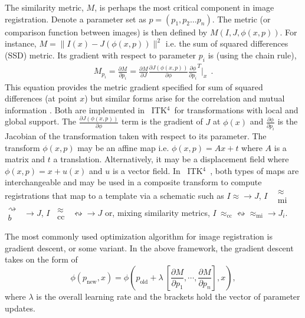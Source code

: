 \documentclass{frontiersSCNS}
\newcommand{\bsp}{$\substack{
   \rightsquigarrow \\
   b
  }$}
\newcommand{\mi}{$\substack{
   \approx \\
   \text{mi}
  }$}
\newcommand{\cc}{$\substack{
   \approx \\
   \text{cc}
  }$}
\newcommand{\tk}{~ITK$^{\text{4}}$~}
\begin{document}
The similarity metric, $M$, is perhaps the most critical component in image registration.  
Denote a parameter set as $p = (p_1, p_2 \ldots p_n)$.  
The metric (or comparison function between images) is then defined by $M(I,J,\phi(x,p))$.  For instance, $M=\|
I(x)-J(\phi(x,p)) \|^2$ i.e. the sum of squared differences (SSD) metric. Its gradient with respect to parameter $p_i$
is (using the chain rule), 
\begin{eqnarray}
 M_{p_i}=\frac{\partial M}{\partial
  p_i}=\frac{\partial M}{\partial J}\frac{\partial
  J(\phi(x,p))}{\partial \phi} \frac{\partial \phi}{\partial p_i}^T|_x
~~.
\label{eq:grad}
\end{eqnarray}
This equation provides the metric gradient specified for
sum of squared differences (at point $x$) but similar forms arise for the correlation
and mutual information \cite{hermosillo}.  Both are implemented in
\tk for transformations with local and global support.  The
$\frac{\partial J(\phi(x,p))}{\partial \phi}$ term is the gradient of $J$ at $\phi(x)$
and $\frac{\partial \phi}{\partial p_i}$ is the Jacobian of the transformation taken
with respect to its parameter.   The transform $\phi(x,p)$ may be
an affine map i.e. $\phi(x,p)=A x + t$ where $A$ is a matrix and
$t$ a translation.  Alternatively, it may be a displacement field
where $\phi(x,p)=x+u(x)$ and
$u$ is a vector field.  In \tk, both types of maps are interchangeable
and may be used in a composite transform to compute registrations that
map to a template via a schematic such as $ I \approx \rightarrow J $, $ I $ ~\mi~\bsp~$
\rightarrow  J $, $ I $~\cc~$ \leftrightsquigarrow \rightarrow J $
or, mixing similarity metrics, $I
~\approx_\text{cc}  \leftrightsquigarrow \approx_\text{mi}  \rightarrow
J_i $.  

The most commonly used optimization algorithm for image registration
is gradient descent, or some variant.   In the above framework, the
gradient descent takes on the form of
$$
\phi(p_\text{new},x)=\phi(p_\text{old}+\lambda~[ \frac{\partial
  M}{\partial p_1} , \cdots , \frac{\partial
  M}{\partial p_n} ] ,  x ),
$$
where $\lambda$ is the overall learning rate and the brackets hold the
vector of parameter updates.  
\end{document}
